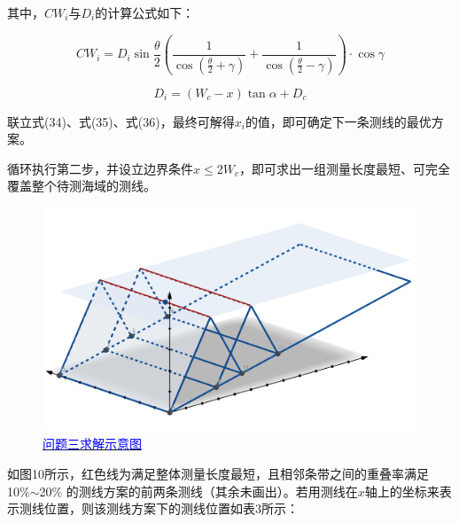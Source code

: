 其中，$CW_i$与$D_i$的计算公式如下：

\begin{equation}
    CW_i = D_i\sin\frac{\theta}{2}\left(\frac{1}{\cos(\frac{\theta}{2}+\gamma)} + \frac{1}{\cos(\frac{\theta}{2}-\gamma)}\right) \cdot \cos \gamma
\end{equation}

\begin{equation}
    D_i =  (W_c - x) \tan{\alpha} + D_c
\end{equation}

联立式(34)、式(35)、式(36)，最终可解得$x_i$的值，即可确定下一条测线的最优方案。

循环执行第二步，并设立边界条件$ x \leq 2W_c $，即可求出一组测量长度最短、可完全覆盖整个待测海域的测线。



\begin{figure}[h]   
    \centering
    \includegraphics[scale=0.4]{res/img/问题三示意图.png}
    \caption{\href{https://www.geogebra.org/classic/bvejtecw}{\textcolor{blue}{问题三求解示意图}}}
    \label{fig:问题三求解示意图}
\end{figure}

如图10所示，红色线为满足整体测量长度最短，且相邻条带之间的重叠率满足 10\%$\sim$20\% 的测线方案的前两条测线（其余未画出）。若用测线在$x$轴上的坐标来表示测线位置，则该测线方案下的测线位置如表3所示：

